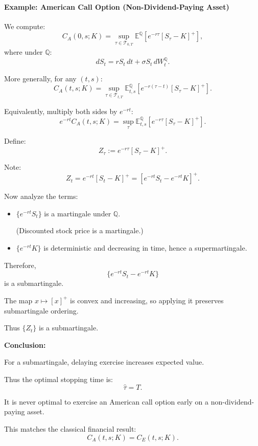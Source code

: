 \documentclass[12pt,a4paper]{article}
\theoremstyle{definition}
\begin{document}
\paragraph{Example: American Call Option (Non-Dividend-Paying Asset)}

We compute:
\[
C_A(0, s; K) = \sup_{\tau \in \mathcal{T}_{0,T}} \mathbb{E}^{\mathbb{Q}}[e^{-r\tau} [S_\tau - K]^+],
\]
where under $\mathbb{Q}$:
\[
dS_t = rS_t \, dt + \sigma S_t \, dW_t^{\mathbb{Q}}.
\]

More generally, for any $(t, s)$:
\[
C_A(t, s; K) = \sup_{\tau \in \mathcal{T}_{t,T}} \mathbb{E}_{t,s}^{\mathbb{Q}}\![e^{-r(\tau - t)} [S_\tau - K]^+].
\]

Equivalently, multiply both sides by $e^{-rt}$:
\[
e^{-rt} C_A(t, s; K) = \sup_{\tau} \mathbb{E}_{t,s}^{\mathbb{Q}}\![e^{-r\tau} [S_\tau - K]^+].
\]

Define:
\[
Z_\tau := e^{-r\tau} [S_\tau - K]^+.
\]

Note:
\[
Z_t = e^{-rt} [S_t - K]^+ = [e^{-rt} S_t - e^{-rt} K]^+.
\]

Now analyze the terms:

\begin{itemize}
\item $\{e^{-rt} S_t\}$ is a martingale under $\mathbb{Q}$.

(Discounted stock price is a martingale.)

\item $\{e^{-rt} K\}$ is deterministic and decreasing in time, hence a supermartingale.
\end{itemize}

Therefore,
\[
\{e^{-rt} S_t - e^{-rt} K\}
\]
is a submartingale.

The map $x \mapsto [x]^+$ is convex and increasing, so applying it preserves submartingale ordering.

Thus $\{Z_t\}$ is a submartingale.

\textbf{Conclusion:}

For a submartingale, delaying exercise increases expected value.

Thus the optimal stopping time is:
\[
\hat{\tau} = T.
\]

It is never optimal to exercise an American call option early on a non-dividend-paying asset.

This matches the classical financial result:
\[
C_A(t, s; K) = C_E(t, s; K).
\]
\end{document}

